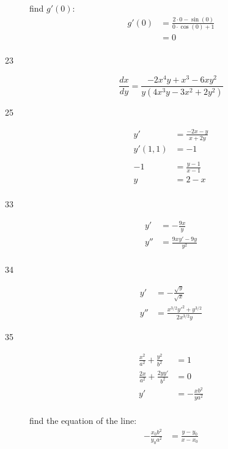 \documentclass[letterpaper, landscape]{exam}
\begin{document}
\begin{description}
      find $g'(0)$:
      \begin{align*}
        g'(0) & = \frac{2 \cdot 0 - \sin (0) }{0 \cdot \cos (0) + 1} \\
              & = \boxed{ 0 } \\
      \end{align*}

    \item[23] 
      \[
        \frac{dx}{dy} = \frac{-2 x^4 y+x^3-6 x y^2}{y \left(4 x^3 y-3 x^2+2 y^2\right)}
      \]

    \item[25] 
      \begin{align*}
        y'       & = \frac{ - 2x - y}{x + 2 y} \\
        y'(1, 1) & = -1 \\
        \\
        -1       & = \frac{y - 1}{x - 1} \\
        y        & = 2 - x \\
      \end{align*}

    \item[33]
      \begin{align*}
        y'  & = - \frac{9x}{y} \\
        y'' & = \frac{9xy' - 9y}{y^2} \\
      \end{align*}

    \item[34] 
      \begin{align*}
        y'  & = - \frac{\sqrt{y}}{\sqrt{x}} \\
        y'' & = \frac{x^{3/2} y'^2 + y^{3/2}}{2x^{3/2} y}
      \end{align*}

    \item[35] 
      \begin{align*}
        \frac{x^2}{a^2} + \frac{y^2}{b^2} & = 1 \\
        \frac{2x}{a^2} + \frac{2yy'}{b^2} & = 0 \\
        y'                                & = - \frac{xb^2}{ya^2} \\
      \end{align*}


      find the equation of the line:
      \begin{align*}
        - \frac{x_0 b^2}{y_0 a^2} &= \frac{y - y_0}{x - x_0} \\
      \end{align*}


\end{description}
\end{document}
